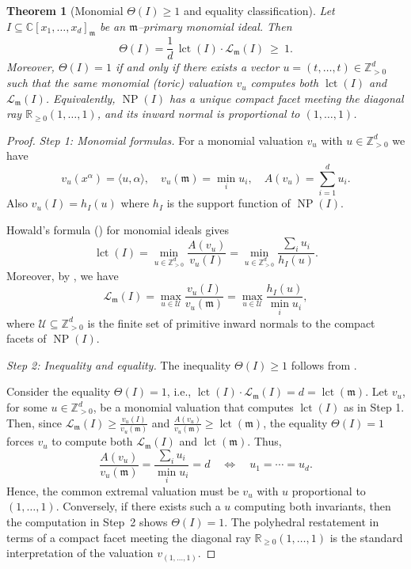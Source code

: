 \documentclass[12pt]{amsart}
\newcommand{\ZZ}{\mathbb{Z}}
\newcommand{\RR}{\mathbb{R}}
\newcommand{\CC}{\mathbb{C}}
\newcommand{\m}{\mathfrak m}
\newcommand{\lct}{\operatorname{\mathrm{lct}}}
\newcommand{\Loj}{\mathcal{L}} %
\newcommand{\ip}[2]{{\langle #1,#2\rangle}}
\DeclareMathOperator{\NP}{NP}
\theoremstyle{plain}
\newtheorem{theorem}{Theorem}[section]
\theoremstyle{definition}
\numberwithin{equation}{section}
\begin{document}
\begin{theorem}[Monomial $\Theta(I)\ge 1$ and equality classification]\label{thm:monomial-rigidity}
	Let $I\subseteq \CC[x_1,\dots,x_d]_\m$ be an $\m$--primary monomial ideal.
	Then
	\[
	\Theta(I)=\frac{1}{d}\,\lct(I)\cdot \Loj_\m(I)\ \ge\ 1.
	\]
	Moreover, $\Theta(I)=1$ if and only if there exists a vector
	$u=(t,\dots,t)\in \ZZ_{>0}^d$ such that the same monomial (toric) valuation $v_u$
	computes both $\lct(I)$ and $\Loj_\m(I)$.
	Equivalently, $\NP(I)$ has a unique compact facet meeting the diagonal ray
	$\RR_{\ge0}(1,\dots,1)$, and its inward normal is proportional to $(1,\dots,1)$.
\end{theorem}

\begin{proof}
	\emph{Step 1: Monomial formulas.}
	For a monomial valuation $v_u$ with $u\in\ZZ_{>0}^d$ we have
	\[
	v_u(x^\alpha)=\ip{u}{\alpha},\quad v_u(\m)=\min_i u_i,\quad A(v_u)=\sum_{i=1}^d u_i.
	\]
	Also $v_u(I)=h_I(u)$ where $h_I$ is the support function of $\NP(I)$.
	
	Howald's formula (\cite{How01}) for monomial ideals gives
	\[
	\lct(I)=\min_{u\in\ZZ_{>0}^d}\frac{A(v_u)}{v_u(I)}
	=
	\min_{u\in\ZZ_{>0}^d}\frac{\sum_i u_i}{h_I(u)}.
	\]
	Moreover, by , we have
	\begin{equation}\label{eq:toric-Loj-formula}
		\Loj_\m(I)
		=
		\max_{u\in\mathcal U}\frac{v_u(I)}{v_u(\m)}
		=
		\max_{u\in\mathcal U}\frac{h_I(u)}{\min_i u_i},
	\end{equation}
	where $\mathcal U\subseteq \ZZ_{>0}^d$ is the finite set of primitive inward normals to the
	compact facets of $\NP(I)$.
	
	\smallskip
	\noindent
	\emph{Step 2: Inequality and equality.} The inequality $\Theta(I) \ge 1$ follows from .

	Consider the equality $\Theta(I)=1$, i.e., $\lct(I)\cdot \Loj_\m(I)=d=\lct(\m)$. Let $v_u$, for some $u \in \ZZ^d_{> 0}$, be a monomial valuation that computes $\lct(I)$ as in Step 1. Then, since $\Loj_{\m}(I) \ge \frac{v_u(I)}{v_u(\m)}$ and $\frac{A(v_u)}{v_u(\m)} \ge \lct(\m)$, the equality $\Theta(I) = 1$ forces $v_u$ to compute both $\Loj_{\m}(I)$ and $\lct(\m)$. Thus,
	\[
	\frac{A(v_u)}{v_u(\m)}=\frac{\sum_i u_i}{\min_i u_i}=d
	\quad\Longleftrightarrow\quad
	u_1=\cdots=u_d.
	\]
	Hence, the common extremal valuation must be $v_u$ with $u$ proportional to $(1,\dots,1)$.
	Conversely, if there exists such a $u$ computing both invariants, then the computation in Step~2
	shows $\Theta(I)=1$.
	The polyhedral restatement in terms of a compact facet meeting the diagonal ray
	$\RR_{\ge0}(1,\dots,1)$ is the standard interpretation of the valuation $v_{(1,\dots,1)}$.
\end{proof}
\end{document}
